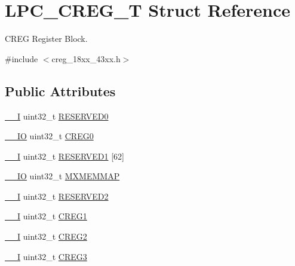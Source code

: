 \hypertarget{struct_l_p_c___c_r_e_g___t}{}\section{L\+P\+C\+\_\+\+C\+R\+E\+G\+\_\+T Struct Reference}
\label{struct_l_p_c___c_r_e_g___t}


C\+R\+EG Register Block.  




{\ttfamily \#include $<$creg\+\_\+18xx\+\_\+43xx.\+h$>$}

\subsection*{Public Attributes}
\begin{DoxyCompactItemize}
\item 
\hyperlink{core__sc300_8h_af63697ed9952cc71e1225efe205f6cd3}{\+\_\+\+\_\+I} uint32\+\_\+t \hyperlink{struct_l_p_c___c_r_e_g___t_a8ff8e0b7b7fdcafcac9d7b3eed2a6887}{R\+E\+S\+E\+R\+V\+E\+D0}
\item 
\hyperlink{core__sc300_8h_aec43007d9998a0a0e01faede4133d6be}{\+\_\+\+\_\+\+IO} uint32\+\_\+t \hyperlink{struct_l_p_c___c_r_e_g___t_a2d4406878e23d28ce7aeffcfc61ed82a}{C\+R\+E\+G0}
\item 
\hyperlink{core__sc300_8h_af63697ed9952cc71e1225efe205f6cd3}{\+\_\+\+\_\+I} uint32\+\_\+t \hyperlink{struct_l_p_c___c_r_e_g___t_a23c0267ee17b13ad8868ff1393994519}{R\+E\+S\+E\+R\+V\+E\+D1} \mbox{[}62\mbox{]}
\item 
\hyperlink{core__sc300_8h_aec43007d9998a0a0e01faede4133d6be}{\+\_\+\+\_\+\+IO} uint32\+\_\+t \hyperlink{struct_l_p_c___c_r_e_g___t_ab42d8c1a520a14805214b436e62a7258}{M\+X\+M\+E\+M\+M\+AP}
\item 
\hyperlink{core__sc300_8h_af63697ed9952cc71e1225efe205f6cd3}{\+\_\+\+\_\+I} uint32\+\_\+t \hyperlink{struct_l_p_c___c_r_e_g___t_aa8469a2acc5a1afdf5e8637bc90771b8}{R\+E\+S\+E\+R\+V\+E\+D2}
\item 
\hyperlink{core__sc300_8h_af63697ed9952cc71e1225efe205f6cd3}{\+\_\+\+\_\+I} uint32\+\_\+t \hyperlink{struct_l_p_c___c_r_e_g___t_a1a841ba5531670c14b97041e7d9283d5}{C\+R\+E\+G1}
\item 
\hyperlink{core__sc300_8h_af63697ed9952cc71e1225efe205f6cd3}{\+\_\+\+\_\+I} uint32\+\_\+t \hyperlink{struct_l_p_c___c_r_e_g___t_a9db0556ccf5c70a237de4f0d04386f74}{C\+R\+E\+G2}
\item 
\hyperlink{core__sc300_8h_af63697ed9952cc71e1225efe205f6cd3}{\+\_\+\+\_\+I} uint32\+\_\+t \hyperlink{struct_l_p_c___c_r_e_g___t_af0e0450b1c2575c82107b0a578c26895}{C\+R\+E\+G3}

\end{DoxyCompactItemize}
